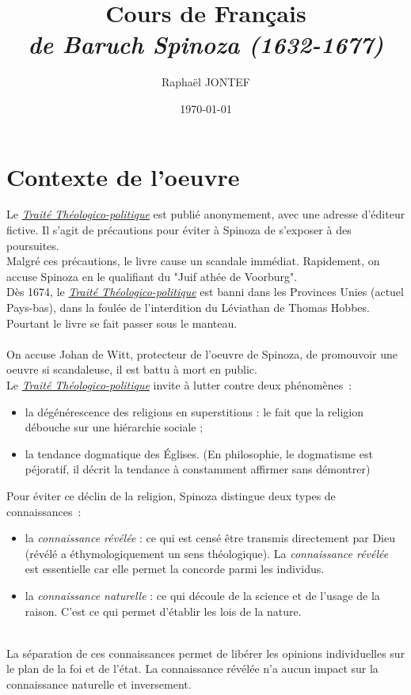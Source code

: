 \documentclass[a4paper,12pt]{article}
\title{Cours de Français\\ \Large \textit{\ttp de Baruch Spinoza (1632-1677)}}
\author{Raphaël JONTEF}
\date{\today}
\newcommand{\ttp}[0]{\underline{\textit{Traité Théologico-politique}} }
\begin{document}
\maketitle


\section{Contexte de l'oeuvre}
Le \ttp est publié anonymement, avec une adresse d'éditeur fictive. Il s'agit de précautions pour éviter à Spinoza de s'exposer à des poursuites. \\
Malgré ces précautions, le livre cause un scandale immédiat. Rapidement, on accuse Spinoza en le qualifiant du "Juif athée de Voorburg". \\
Dès 1674, le \ttp est banni dans les Provinces Unies (actuel Pays-bas), dans la foulée de l'interdition du Léviathan de Thomas Hobbes. Pourtant le livre se fait passer sous le manteau. \\ \\
On accuse Johan de Witt, protecteur de l'oeuvre de Spinoza, de promouvoir une oeuvre si scandaleuse, il est battu à mort en public. \\
\vspace{1em}
Le \ttp invite à lutter contre deux phénomènes~:
\begin{itemize}
    \item la dégénérescence des religions en superstitions : le fait que la religion débouche sur une hiérarchie sociale ;
    \item la tendance dogmatique des Églises. (En philosophie, le dogmatisme est péjoratif, il décrit la tendance à constamment affirmer sans démontrer)
\end{itemize}
\vspace{1em}
Pour éviter ce déclin de la religion, Spinoza distingue deux types de connaissances~:
\begin{itemize}
    \item la \textit{connaissance révélée} : ce qui est censé être transmis directement par Dieu (révélé a éthymologiquement un sens théologique). La \textit{connaissance révélée} est essentielle car elle permet la concorde parmi les individus.
    \item la \textit{connaissance naturelle} : ce qui découle de la science et de l'usage de la raison. C'est ce qui permet d'établir les lois de la nature.
\end{itemize}
\\La séparation de ces connaissances permet de libérer les opinions individuelles sur le plan de la foi et de l'état. La connaissance révélée n'a aucun impact sur la connaissance naturelle et inversement.
\end{document}
